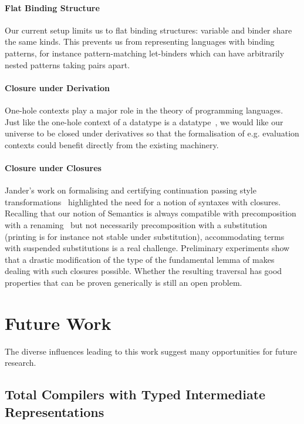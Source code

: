 \paragraph{Flat Binding Structure} Our current setup limits us to flat binding
structures: variable and binder share the same kinds. This prevents us from
representing languages with binding patterns, for instance pattern-matching
let-binders which can have arbitrarily nested patterns taking pairs apart.

\paragraph{Closure under Derivation} One-hole contexts play a major role in the
theory of programming languages. Just like the one-hole context of a datatype is
a datatype~\cite{DBLP:journals/fuin/AbbottAMG05}, we would like our universe to
be closed under derivatives so that the formalisation of e.g. evaluation contexts
could benefit directly from the existing machinery.

\paragraph{Closure under Closures} Jander's work on formalising and certifying
continuation passing style transformations~\cite{Jander:Thesis:2019}
highlighted the need for a notion of syntaxes with closures. Recalling
that our notion of Semantics is always compatible with precomposition
with a renaming~\cite{Kaiser-wsdebr} but not necessarily
precomposition with a substitution (printing is for instance not
stable under substitution), accommodating terms with suspended
substitutions is a real challenge. Preliminary experiments show that a
drastic modification of the type of the fundamental lemma of
 makes dealing with such closures possible. Whether the
resulting traversal has good properties that can be proven generically
is still an open problem.

\section{Future Work}

The diverse influences leading to this work suggest many opportunities
for future research.

\subsection{Total Compilers with Typed Intermediate Representations}

